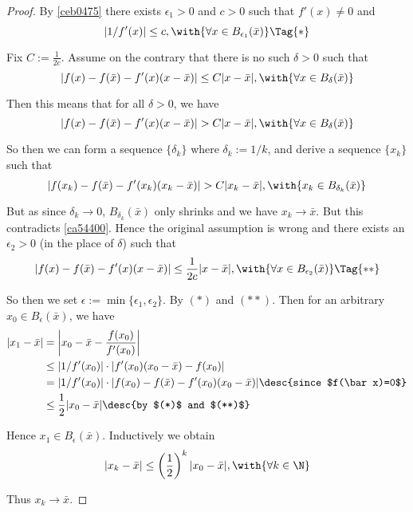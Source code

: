 \begin{proof}
  By \autoref{ceb0475} there exists $\epsilon_1>0$ and $c>0$ such that
  $f'(x)\neq0$ and
  \begin{equation*}
    |1/f'(x)|\leq c,\with{\forall x\in B_{\epsilon_1}(\bar x)}\Tag{*}
  \end{equation*}

  Fix $C:=\frac{1}{2c}$. Assume on the contrary that there is no such
  $\delta>0$ such that
  $$
    |f(x)-f(\bar x)-f'(x)(x-\bar x)|\leq C|x-\bar x|,
    \with{\forall x\in B_\delta(\bar x)}
  $$

  Then this means that for all $\delta>0$, we have
  $$
    |f(x)-f(\bar x)-f'(x)(x-\bar x)|>C|x-\bar x|,
    \with{\forall x\in B_\delta(\bar x)}
  $$

  So then we can form a sequence $\{\delta_k\}$ where $\delta_k:=1/k$, and
  derive a sequence $\{x_k\}$ such that
  $$
    |f(x_k)-f(\bar x)-f'(x_k)(x_k-\bar x)|>C|x_k-\bar x|,
    \with{x_k\in B_{\delta_k}(\bar x)}
  $$

  But as since $\delta_k\to0$, $B_{\delta_k}(\bar x)$ only shrinks and we have
  $x_k\to\bar x$. But this contradicts \autoref{ca54400}. Hence the original
  assumption is wrong and there exists an $\epsilon_2>0$ (in the place of
  $\delta$) such that
  \begin{equation*}
    |f(x)-f(\bar x)-f'(x)(x-\bar x)|\leq\frac{1}{2c}|x-\bar x|,
    \with{\forall x\in B_{\epsilon_2}(\bar x)}\Tag{**}
  \end{equation*}

  So then we set $\epsilon:=\min\{\epsilon_1,\epsilon_2\}$. By $(*)$ and
  $(**)$. Then for an arbitrary $x_0\in B_\epsilon(\bar x)$, we have
  \begin{align*}
    |x_1-\bar x| &=\left|x_0-\bar x-\frac{f(x_0)}{f'(x_0)}\right|                                     \\
                 &\leq|1/{f'(x_0)}|\cdot|f'(x_0)(x_0-\bar x)-f(x_0)|                                  \\
                 &=|1/{f'(x_0)}|\cdot|f(x_0)-f(\bar x)-f'(x_0)(x_0-\bar x)|\desc{since $f(\bar x)=0$} \\
                 &\leq\frac12|x_0-\bar x|\desc{by $(*)$ and $(**)$}
  \end{align*}

  Hence $x_1\in B_\epsilon(\bar x)$. Inductively we obtain
  $$
    |x_k-\bar x|\leq\left(\frac12\right)^k|x_0-\bar x|,\with{\forall k\in\N}
  $$

  Thus $x_k\to\bar x$.
\end{proof}

